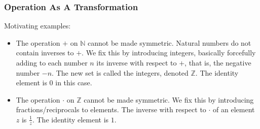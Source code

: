 \documentclass[aspectratio=169,11pt,usenames,dvipsnames,handout]{beamer}
\newcommand{\N}{\mathbb{N}}
\newcommand{\Z}{\mathbb{Z}}
\begin{document}
\begin{frame}
 \frametitle{Operation As A Transformation}
 \alert{Motivating examples:}
 \begin{itemize}
  \item The operation $+$ on $\N$ \alert{cannot be made symmetric}. Natural
   numbers do not contain inverses to $+$.\pause
  We fix this by introducing \alert{integers}, basically forcefully adding to
  each number $n$ its inverse with respect to $+$, that is, the negative number
  $-n$. The new set is called the \alert{integers}, denoted $\Z$. The identity
  element is $0$ in this case.\pause
 \item The operation $ \cdot $ on $\Z$ cannot be made symmetric. We fix this by
  introducing \alert{fractions/reciprocals} to elements. The inverse with
  respect to $ \cdot $ of an element $z$ is $\frac{1}{z}$. The identity element
  is $1$.
 \end{itemize}
\end{frame}

%
\end{document}
